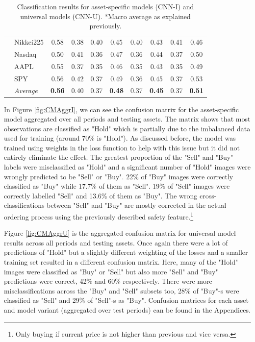 \documentclass[11pt, a4paper]{article}
\begin{document}
\begin{table}[H]
\begin{tabular}{l|l|cc|cc|cc|cc}
& Nikkei225        & 0.58          & 0.38 & 0.40 & 0.45          & 0.40 & 0.43          & 0.41 & 0.46          \\
& Nasdaq           & 0.50          & 0.41 & 0.36 & 0.47          & 0.36 & 0.44          & 0.37 & 0.50          \\
& AAPL             & 0.55          & 0.37 & 0.35 & 0.46          & 0.35 & 0.43          & 0.35 & 0.49          \\
& SPY              & 0.56          & 0.42 & 0.37 & 0.49          & 0.36 & 0.45          & 0.37 & 0.53          \\ \cline{2-10}
& \textit{Average} & \textbf{0.56} & 0.40 & 0.37 & \textbf{0.48} & 0.37 & \textbf{0.45} & 0.37 & \textbf{0.51}
\end{tabular}
\caption{Classification results for asset-specific models (CNN-I) and universal models (CNN-U). *Macro average as explained previously.}
\label{tbl:ClassRes}
\end{table}

In Figure \ref{fig:CMAggrI}, we can see the confusion matrix for the asset-specific model aggregated over all periods and testing assets. The matrix shows that most observations are classified as "Hold" which is partially due to the imbalanced data used for training (around 70\% is "Hold"). As discussed before, the model was trained using weights in the loss function to help with this issue but it did not entirely eliminate the effect. The greatest proportion of the "Sell" and "Buy" labels were misclassified as "Hold" and a significant number of "Hold" images were wrongly predicted to be "Sell" or "Buy". 22\% of "Buy" images were correctly classified as "Buy" while 17.7\% of them as "Sell". 19\% of "Sell" images were correctly labelled "Sell" and 13.6\% of them as "Buy". The wrong cross-classifications between "Sell" and "Buy" are mostly corrected in the actual ordering process using the previously described safety feature.\footnote{Only buying if current price is not higher than previous and vice versa.}

Figure \ref{fig:CMAggrU} is the aggregated confusion matrix for universal model results across all periods and testing assets. Once again there were a lot of predictions of "Hold" but a slightly different weighting of the losses and a smaller training set resulted in a different confusion matrix. Here, many of the "Hold" images were classified as "Buy" or "Sell" but also more "Sell" and "Buy" predictions were correct, 42\% and 60\% respectively. There were more misclassifications across the "Buy" and "Sell" subsets too, 28\% of "Buy"-s were classified as "Sell" and 29\% of "Sell"-s as "Buy". Confusion matrices for each asset and model variant (aggregated over test periods) can be found in the Appendices.
\end{document}
